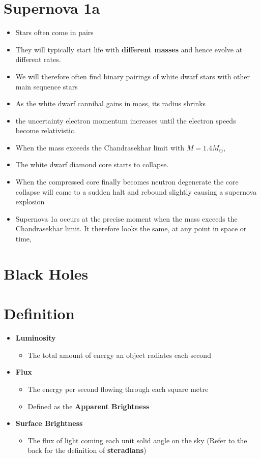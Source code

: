 \documentclass{article}
\begin{document}
\section{Supernova 1a}
\begin{itemize}
    \item Stars often come in pairs
    \item They will typically start life with \textbf{different masses} and hence evolve at different rates.
    \item We will therefore often find binary pairings of white dwarf stars with other main sequence stars
    \item  As the white dwarf cannibal gains in mass, its
radius shrinks 
    \item the uncertainty electron momentum increases until the electron
speeds become relativistic.
    \item When the mass exceeds the Chandrasekhar limit with $M = 1.4M_\odot$,
    \item The white dwarf diamond core starts to collapse. \item When the compressed core finally becomes neutron degenerate the core collapse will come to a sudden halt and rebound slightly causing a supernova explosion
    \item Supernova 1a occurs at the precise moment when the mass exceeds the Chandrasekhar limit. It therefore looks the same, at any point in space or time,
\end{itemize}
\section{Black Holes}

\section{Definition}
\begin{itemize}
\item \textbf{Luminosity}
\begin{itemize}
\item The total amount of energy an object radiates each second
\end{itemize}
\item \textbf{Flux}
\begin{itemize}
\item The energy per second flowing through each square metre
\item Defined as the \textbf{Apparent Brightness}
\end{itemize}
\item \textbf{Surface Brightness }
\begin{itemize}
\item The flux of light coming each unit solid angle on the sky (Refer to the back for the definition of \textbf{steradians})
\end{itemize}
\end{itemize}
\end{document}
